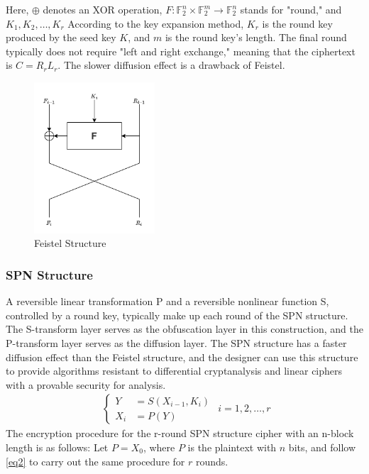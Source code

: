 Here, $\oplus$ denotes an XOR operation, $F: \mathbb{F}^n_2\times \mathbb{F}^m_2\to \mathbb{F}^n_2$ stands for "round," and $K_1,K_2,\dots, K_r$ According to the key expansion method, $K_r$ is the round key produced by the seed key $K$, and $m$ is the round key's length. The final round typically does not require "left and right exchange," meaning that the ciphertext is $C=R_rL_r$. The slower diffusion effect is a drawback of Feistel.


\begin{figure}[hbt!]
    \centering
    \includegraphics[width=45mm]{Feistel}
    \caption[Boomerang Attack Model]{Feistel Structure}\label{fig:Feistel}
\end{figure}

\subsubsection{SPN Structure}
A reversible linear transformation P and a reversible nonlinear function S, controlled by a round key, typically make up each round of the SPN structure. The S-transform layer serves as the obfuscation layer in this construction, and the P-transform layer serves as the diffusion layer. The SPN structure has a faster diffusion effect than the Feistel structure, and the designer can use this structure to provide algorithms resistant to differential cryptanalysis and linear ciphers with a provable security for analysis.
\begin{equation}
    \begin{aligned}
        \begin{cases}
            Y&=S(X_{i-1},K_i)\\
            X_i&=P(Y)
        \end{cases}
    \end{aligned}
    i=1,2,\dots,r  
    \label{eq2}
\end{equation}
The encryption procedure for the r-round SPN structure cipher with an n-block length is as follows: Let $P=X_0$, where $P$ is the plaintext with $n$ bits, and follow \eqref{eq2} to carry out the same procedure for $r$ rounds.

